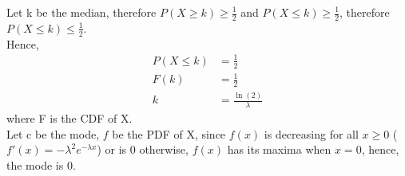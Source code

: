 Let k be the median, therefore $P(X \ge k) \ge \frac{1}{2}$ and $P(X \le k) \ge \frac{1}{2}$, therefore $P(X \le k) \le \frac{1}{2}$. \\ 
Hence,
\begin{align*}
    P(X \le k) &= \frac{1}{2} \\
    F(k) &=  \frac{1}{2} \\
    k &= \frac{\ln(2)}{\lambda}
\end{align*}
where F is the CDF of X. \\

Let c be the mode, $f$ be the PDF of X, since $f(x)$ is decreasing for all $x \ge 0$ ($f'(x) = -\lambda^{2}e^{-\lambda x}$) or is 0 otherwise, $f(x)$ has its maxima when $x=0$, hence, the mode is 0.
